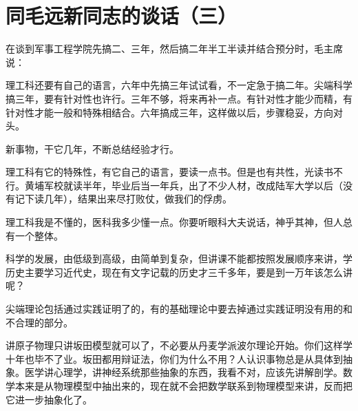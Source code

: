 \section[同毛远新同志的谈话（三）（一九六六年二月十八日）]{同毛远新同志的谈话（三）}


在谈到军事工程学院先搞二、三年，然后搞二年半工半读并结合预分时，毛主席说：

理工科还要有自己的语言，六年中先搞三年试试看，不一定急于搞二年。尖端科学搞三年，要有针对性也许行。三年不够，将来再补一点。有针对性才能少而精，有针对性才能一般和特殊相结合。六年搞成三年，这样做以后，步骤稳妥，方向对头。

新事物，干它几年，不断总结经验才行。

理工科有它的特殊性，有它自己的语言，要读一点书。但是也有共性，光读书不行。黄埔军校就读半年，毕业后当一年兵，出了不少人材，改成陆军大学以后（没有记下读几年），结果出来尽打败仗，做我们的俘虏。

理工科我是不懂的，医科我多少懂一点。你要听眼科大夫说话，神乎其神，但人总有一个整体。

科学的发展，由低级到高级，由简单到复杂，但讲课不能都按照发展顺序来讲，学历史主要学习近代史，现在有文字记载的历史才三千多年，要是到一万年该怎么讲呢？

尖端理论包括通过实践证明了的，有的基础理论中要去掉通过实践证明没有用的和不合理的部分。

讲原子物理只讲坂田模型就可以了，不必要从丹麦学派波尔理论开始。你们这样学十年也毕不了业。坂田都用辩证法，你们为什么不用？人认识事物总是从具体到抽象。医学讲心理学，讲神经系统那些抽象的东西，我看不对，应该先讲解剖学。数学本来是从物理模型中抽出来的，现在就不会把数学联系到物理模型来讲，反而把它进一步抽象化了。

